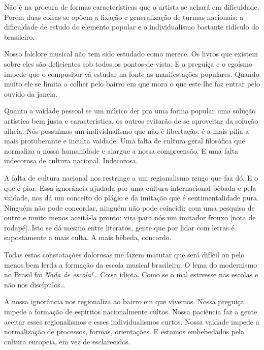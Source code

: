 Não é na procura de formas características que o artista se achará em
dificuldade. Porém duas coisas se opõem a fixação e generalização de
turmas nacionais: a dificuldade de estudo do elemento popular e o
individualismo bastante ridículo do brasileiro.

Nosso folclore musical não tem sido estudado como merece. Os livros que
existem sobre eles são deficientes sob todos os pontos-de-vista. E a
preguiça e o egoísmo impede que o compositor vá estudar na fonte as
manifestações populares. Quando muito ele se limita a colher pelo bairro
em que mora o que este lhe faz entrar pelo ouvido da janela.

Quanto a vaidade pessoal se um músico der pra uma forma popular uma
solução artística bem justa e característica, os outros evitarão de se
aproveitar da solução alheia. Nós possuímos um individualismo que não é
libertação: é a mais pífia a mais protuberante e inculta vaidade. Uma
falta de cultura geral filosófica que normaliza a nossa humanidade e
alargue a nossa compreensão. E uma falta indecorosa de cultura nacional.
Indecorosa.

A falta de cultura nacional nos restringe a um regionalismo rengo que
faz dó. E o que é pior: Essa ignorância ajudada por uma cultura
internacional bêbada e pela vaidade, nos dá um conceito do plágio e da
imitação que é sentimentalidade pura. Ninguém não pode concordar,
ninguém não pode coincidir com uma pesquisa de outro e muito menos
aceitá-la pronto: vira para nós um imitador frouxo {[}nota de rodapé{]}.
Isto se dá mesmo entre literatos, gente que por lidar com letras é
supostamente a mais culta. A mais bêbeda, concordo.

Todas estas constatações dolorosas me fazem matutar que será difícil ou
pelo menos bem lerda a formação da escola musical brasileira. O lema do
modernismo no Brasil foi \emph{Nada de escola!}\ldots{} Coisa idiota. Como se
o mal estivesse nas escolas e não nos discípulos\ldots{}

A nossa ignorância nos regionaliza ao bairro em que vivemos. Nossa
preguiça impede a formação de espíritos nacionalmente cultos. Nossa
paciência faz a gente aceitar esses regionalismos e esses
individualismos curtos. Nossa vaidade impede a normalização de
processos, formas, orientações. E estamos embebedados pela cultura
europeia, em vez de esclarecidos.


